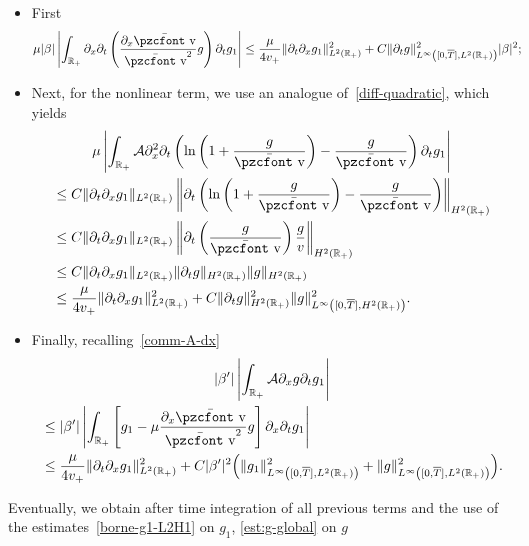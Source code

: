\documentclass[10pt]{amsart}
\theoremstyle{definition}\newtheorem{defi}[theo]{Definition}\newtheorem{rema}[theo]{Remark}\newtheorem{exam}[theo]{Example}\newtheorem{exem}[theo]{Example}\newtheorem{nota}[theo]{Notation}
\newcommand{\mathpzc}[1]{\text{\pzcfont #1}}
\newcommand{\R}{\mathbb{R}}
\newcommand{\p}{\partial}
\newcommand{\bv}{\bar{\mathpzc{v}}}
\newcommand{\cA}{\mathcal A}
\begin{document}
\begin{itemize}
\item First
\begin{align*}
\mu |\beta| \left|\int_{\R_+} \partial_x \partial_t \left(\dfrac{\partial_x \bv}{\bv^2} g \right) \partial_t g_1 \right| & \leq \dfrac{\mu}{4 v_+} \|\partial_t \partial_x g_1\|_{L^2(\R_+)}^2 + C \|\partial_t g\|_{L^\infty\left([0,\overline{T}],L^2(\R_+)\right)}^2 |\beta|^2;
\end{align*}
\item Next, for the nonlinear term, we use an analogue of~\eqref{diff-quadratic}, which yields
\begin{multline*}
 \mu \left| \int_{\R_+} \cA \partial_x^2 \partial_t \left(\ln \left(1+ \dfrac{g}{\bv}\right) - \dfrac{g}{\bv} \right) \partial_t g_1\right|\\
\begin{aligned}
&\leq C\|\p_t \p_x g_1\|_{L^2(\R_+)} \left\| \partial_t \left(\ln \left(1+ \dfrac{g}{\bv}\right) - \dfrac{g}{\bv} \right)\right\|_{H^2(\R_+)}\\
&\leq C\|\p_t \p_x g_1\|_{L^2(\R_+)} \left\| \p_t \left(\frac{g}{\bv}\right) \frac{g}{v} \right\|_{H^2(\R_+)}\\
&\leq C\|\p_t \p_x g_1\|_{L^2(\R_+)} \|\p_t g\|_{H^2(\R_+)} \|g\|_{H^2(\R_+)}\\
&\leq \dfrac{\mu}{4v_+} \|\partial_t \partial_x g_1\|_{L^2(\R_+)}^2 + C \|\p_t g\|_{H^2(\R_+)}^2 \|g\|_{L^\infty\left([0, \overline{T}], H^2(\R_+)\right)}^2.
\end{aligned}
\end{multline*}



\item Finally, recalling~\eqref{comm-A-dx}
\begin{multline*}
|\beta'| \left| \int_{\R_+}\cA\partial_x g \partial_t g_1 \right|\\
\begin{aligned}
& \leq |\beta'| \left| \int_{\R_+}\left[g_1 - \mu \dfrac{\partial_x \bv}{\bv^2} g \right] \partial_x \partial_t g_1 \right| \\
& \leq \dfrac{\mu}{4v_+} \|\partial_t \partial_x g_1\|_{L^2(\R_+)}^2 + C |\beta'|^2 \Big(\|g_1\|_{L^\infty\left([0,\overline{T}],L^2(\R_+)\right)}^2 + \|g\|_{L^\infty\left([0,\overline{T}],L^2(\R_+)\right)}^2\Big).
\end{aligned}
\end{multline*}
\end{itemize}
Eventually, we obtain after time integration of all previous terms and the use of the estimates~\eqref{borne-g1-L2H1} on $g_1$, \eqref{est:g-global} on $g$
\end{document}
